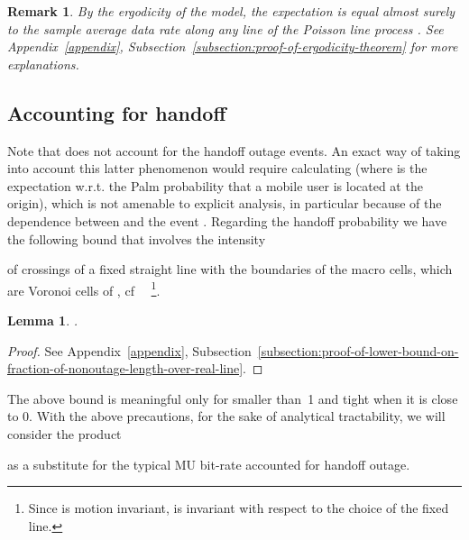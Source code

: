 \documentclass[10pt,journal]{IEEEtran}
\newtheorem{lemma}{Lemma}
\newtheorem{remark}{Remark}
\begin{document}
\begin{remark}\label{rem:ergodicity-along-a-line-without-handoff-for-a-single-user}
By the ergodicity of the model, the expectation  is equal almost surely to the
sample average data rate along  any line of the Poisson line process .
 See Appendix~\ref{appendix},
 Subsection~\ref{subsection:proof-of-ergodicity-theorem} for more  explanations.
\end{remark}





\subsection{Accounting for handoff}
\label{ss.rate-handoff}
Note that  does not account for the handoff   outage
  events. An exact way of taking into account this latter phenomenon
  would require calculating  
  (where  is the expectation w.r.t. the Palm probability that a mobile user is located at the origin), 
  which is not amenable to explicit analysis, in particular because of
the  dependence between  and the event . Regarding the  handoff probability we have the
  following bound that involves the  intensity  

of crossings of a fixed
 straight line with the boundaries of the macro 
 cells, which are Voronoi cells of ,
 cf~\cite[Equations~ with ]{okabe99spatial-tesselations}
~\footnote{Since  is motion invariant,  is invariant with respect to the choice of the fixed
  line.}.
\begin{lemma}\label{lemma:lower-bound-on-fraction-of-nonoutage-length-over-real-line}
.
\end{lemma}
\begin{proof}
See
Appendix~\ref{appendix}, 
Subsection~\ref{subsection:proof-of-lower-bound-on-fraction-of-nonoutage-length-over-real-line}.
\end{proof}
The above bound is meaningful only for  smaller than~1
and  tight when it is close to 0. With the above precautions, for the
sake of analytical tractability, we 
will consider the product 
  
as a substitute for the typical MU bit-rate accounted for handoff outage.  
\end{document}

